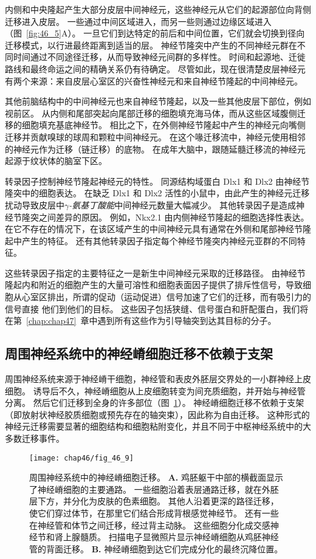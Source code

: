 内侧和中央隆起产生大部分皮层中间神经元，这些神经元从它们的起源部位向背侧迁移进入皮层。
一些通过中间区域进入，而另一些则通过边缘区域进入（图~\ref{fig:46_5}A）。
一旦它们到达特定的前后和中间位置，它们就会切换到径向迁移模式，以行进最终距离到适当的层。
神经节隆突中产生的不同神经元群在不同时间通过不同途径迁移，从而导致神经元间群的多样性。
时间和起源地、迁徙路线和最终命运之间的精确关系仍有待确定。
尽管如此，现在很清楚皮层神经元有两个来源：来自皮层心室区的兴奋性神经元和来自神经节隆起的中间神经元。


其他前脑结构中的中间神经元也来自神经节隆起，以及一些其他皮层下部位，例如视前区。
从内侧和尾部突起向尾部迁移的细胞填充海马体，而从这些区域腹侧迁移的细胞填充基底神经节。
相比之下，在外侧神经节隆起中产生的神经元向嘴侧迁移并贡献嗅球的球周和颗粒中间神经元。
在这个喙迁移流中，神经元使用相邻的神经元作为迁移（链迁移）的底物。
在成年大脑中，跟随延髓迁移流的神经元起源于纹状体的脑室下区。


转录因子控制神经节隆起神经元的特性。
同源结构域蛋白 Dlx1 和 Dlx2 由神经节隆突中的细胞表达。
在缺乏 Dlx1 和 Dlx2 活性的小鼠中，由此产生的神经元迁移扰动导致皮层中\textit{$\gamma$-氨基丁酸能}中间神经元数量大幅减少。
其他转录因子是造成神经节隆突之间差异的原因。
例如，Nkx2.1 由内侧神经节隆起的细胞选择性表达。
在它不存在的情况下，在该区域产生的中间神经元具有通常在外侧和尾部神经节隆起中产生的特征。
还有其他转录因子指定每个神经节隆突内神经元亚群的不同特征。


这些转录因子指定的主要特征之一是新生中间神经元采取的迁移路径。
由神经节隆起内和附近的细胞产生的大量可溶性和细胞表面因子提供了排斥性信号，导致细胞从心室区排出，所谓的促动（运动促进）信号加速了它们的迁移，而有吸引力的信号直接 他们到他们的目标。
这些因子包括狭缝、信号蛋白和肝配蛋白，我们将在第~\ref{chap:chap47}~章中遇到所有这些作为引导轴突到达其目标的分子。



\subsection{周围神经系统中的神经嵴细胞迁移不依赖于支架}

周围神经系统来源于神经嵴干细胞，神经管和表皮外胚层交界处的一小群神经上皮细胞。
诱导后不久，神经嵴细胞从上皮细胞转变为间充质细胞，并开始与神经管分离。
然后它们迁移到全身的许多部位（图~\ref{fig:46_9}）。
神经嵴细胞迁移不依赖于支架（即放射状神经胶质细胞或预先存在的轴突束），因此称为自由迁移。
这种形式的神经元迁移需要显著的细胞结构和细胞粘附变化，并且不同于中枢神经系统中的大多数迁移事件。


\begin{figure}[htbp]
	\centering
	\texttt{[image: chap46/fig\_46\_9]}
	\caption{周围神经系统中的神经嵴细胞迁移。
		\textbf{A.} 鸡胚躯干中部的横截面显示了神经嵴细胞的主要通路。
		一些细胞沿着表层通路迁移，就在外胚层下方，并分化为皮肤的色素细胞。
		其他人沿着更深的路径迁移，使它们穿过体节，在那里它们结合形成背根感觉神经节。
		还有一些在神经管和体节之间迁移，经过背主动脉。
		这些细胞分化成交感神经节和肾上腺髓质。
		扫描电子显微照片显示神经嵴细胞从鸡胚神经管的背面迁移。
		\textbf{B.} 神经嵴细胞到达它们完成分化的最终沉降位置。}
	\label{fig:46_9}
\end{figure}


